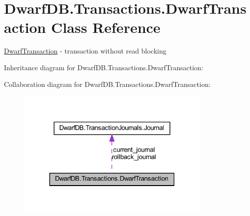 \hypertarget{class_dwarf_d_b_1_1_transactions_1_1_dwarf_transaction}{\section{Dwarf\+D\+B.\+Transactions.\+Dwarf\+Transaction Class Reference}
\label{class_dwarf_d_b_1_1_transactions_1_1_dwarf_transaction}
}


\hyperlink{class_dwarf_d_b_1_1_transactions_1_1_dwarf_transaction}{Dwarf\+Transaction} -\/ transaction without read blocking  




Inheritance diagram for Dwarf\+D\+B.\+Transactions.\+Dwarf\+Transaction\+:


Collaboration diagram for Dwarf\+D\+B.\+Transactions.\+Dwarf\+Transaction\+:
\nopagebreak
\begin{figure}[H]
\begin{center}
\leavevmode
\includegraphics[width=270pt]{class_dwarf_d_b_1_1_transactions_1_1_dwarf_transaction__coll__graph}
\end{center}
\end{figure}
